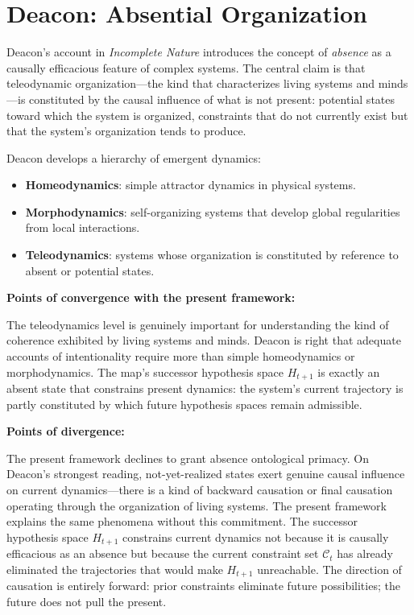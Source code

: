 \section{Deacon: Absential Organization}

Deacon's account in \emph{Incomplete Nature} \citep{deacon2011} introduces the concept of
\emph{absence} as a causally efficacious feature of complex systems. The central
claim is that teleodynamic organization---the kind that characterizes living
systems and minds---is constituted by the causal influence of what is not present:
potential states toward which the system is organized, constraints that do not
currently exist but that the system's organization tends to produce.

Deacon develops a hierarchy of emergent dynamics:
\begin{itemize}
  \item \textbf{Homeodynamics}: simple attractor dynamics in physical systems.
  \item \textbf{Morphodynamics}: self-organizing systems that develop global
    regularities from local interactions.
  \item \textbf{Teleodynamics}: systems whose organization is constituted by
    reference to absent or potential states.
\end{itemize}

\textbf{Points of convergence with the present framework:}

The teleodynamics level is genuinely important for understanding the kind of
coherence exhibited by living systems and minds. Deacon is right that adequate
accounts of intentionality require more than simple homeodynamics or
morphodynamics. The \KES map's successor hypothesis space $H_{t+1}$ is exactly
an absent state that constrains present dynamics: the system's current trajectory
is partly constituted by which future hypothesis spaces remain admissible.

\textbf{Points of divergence:}

The present framework declines to grant absence ontological primacy. On Deacon's
strongest reading, not-yet-realized states exert genuine causal influence on
current dynamics---there is a kind of backward causation or final causation
operating through the organization of living systems. The present framework
explains the same phenomena without this commitment. The \KES successor
hypothesis space $H_{t+1}$ constrains current dynamics not because it is
causally efficacious as an absence but because the current constraint set
$\mathcal{C}_t$ has already eliminated the trajectories that would make
$H_{t+1}$ unreachable. The direction of causation is entirely forward: prior
constraints eliminate future possibilities; the future does not pull the present.

